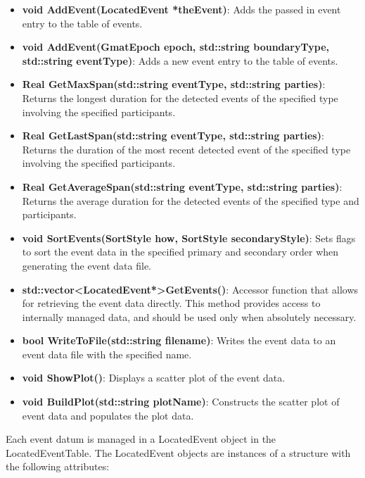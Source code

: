 \documentclass[letterpaper,10pt]{article}
\begin{document}
\begin{itemize}
\item \textbf{void AddEvent(LocatedEvent *theEvent)}: Adds the passed in event
entry to the table of events.
\item \textbf{void AddEvent(GmatEpoch epoch, std::string boundaryType,
std::string eventType)}: Adds a new event entry to the table of events.
\item \textbf{Real GetMaxSpan(std::string eventType, std::string parties)}:
Returns the longest duration for the detected events of the specified type
involving the specified participants.
\item \textbf{Real GetLastSpan(std::string eventType, std::string parties)}:
Returns the duration of the most recent detected event of the specified type
involving the specified participants.
\item \textbf{Real GetAverageSpan(std::string eventType, std::string parties)}:
Returns the average duration for the detected events of the specified type and
participants.
\item \textbf{void SortEvents(SortStyle how, SortStyle secondaryStyle)}:
Sets flags to sort the event data in the specified primary and secondary order
when generating the event data file.
\item \textbf{std::vector\textless LocatedEvent*\textgreater  *GetEvents()}:
Accessor function that allows for retrieving the event data directly.  This
method provides access to internally managed data, and should be used only when
absolutely necessary.
\item  \textbf{bool WriteToFile(std::string filename)}: Writes the event data
to an event data file with the specified name.
\item \textbf{void ShowPlot()}: Displays a scatter plot of the event data.
\item \textbf{void BuildPlot(std::string plotName)}:  Constructs the scatter
plot of event data and populates the plot data.
\end{itemize}

Each event datum is managed in a LocatedEvent object in the LocatedEventTable. 
The LocatedEvent objects are instances of a structure with the following
attributes:
\end{document}

